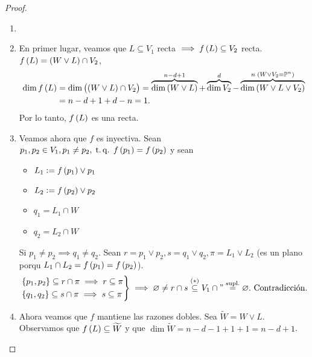 \begin{proof}
    \begin{enumerate}[(1)]
        \item[]
        \item \label{item:col_teo2_it1} En primer lugar, veamos que $L \subseteq V_1$ recta $\implies f \lp L \rp \subseteq V_2$ recta. $f \lp L \rp = \lp W \vee L \rp \cap V_2$,
        \begin{align*}
            \dim f \lp L \rp &= \dim \lp \lp W \vee L \rp \cap V_2 \rp = \overbrace{\dim \lp W \vee L \rp}^{n-d+1} + \overbrace{\dim V_2}^d - \overbrace{\dim \lp W \vee L \vee V_2 \rp}^{n \; \lp W \vee V_2 = \Po^n \rp} \\
            &= n - d + 1 + d - n = 1.
        \end{align*}
        Por lo tanto, $f \lp L \rp$ es una recta.
        \item \label{item:col_teo2_it2} Veamos ahora que $f$ es inyectiva. Sean $p_1, p_2 \in V_1, p_1 \neq p_2, \tq f \lp p_1 \rp = f \lp p_2 \rp$ y sean
        \begin{itemize}
            \item $L_1 := f \lp p_1 \rp \vee p_1$
            \item $L_2 := f \lp p_2 \rp \vee p_2$
            \item $q_1 = L_1 \cap W$
            \item $q_2 = L_2 \cap W$
        \end{itemize}
        Si $p_1 \neq p_2 \implies q_1 \neq q_2$. Sean $r = p_1 \vee p_2, s = q_1 \vee q_2, \pi = L_1 \vee L_2$ (es un plano porqu $L_1 \cap L_2 = f \lp p_1 \rp = f \lp p_2 \rp$).
        \begin{gather*}
            \begin{rcases}
                \{ p_1, p_2 \} \subseteq r \cap \pi \implies r \subseteq \pi \\
                \{ q_1, q_2 \} \subseteq s \cap \pi \implies s \subseteq \pi
            \end{rcases}
            \implies \emptyset \neq r \cap s \stackrel{(*)}{\subseteq} V_1 \cap " \stackrel{\text{supl.}}{=} \emptyset. \text{ Contradicción.}
        \end{gather*}
        \item \label{item:col_teo2_it3} Ahora veamos que $f$ mantiene las razones dobles. Sea $\widetilde{W} = W \vee L $. Observamos que $f \lp L \rp \subseteq \widetilde{W}$ y que $\dim \widetilde{W} = n-d-1+1+1= n-d+1$. \\

\end{enumerate}
\end{proof}
